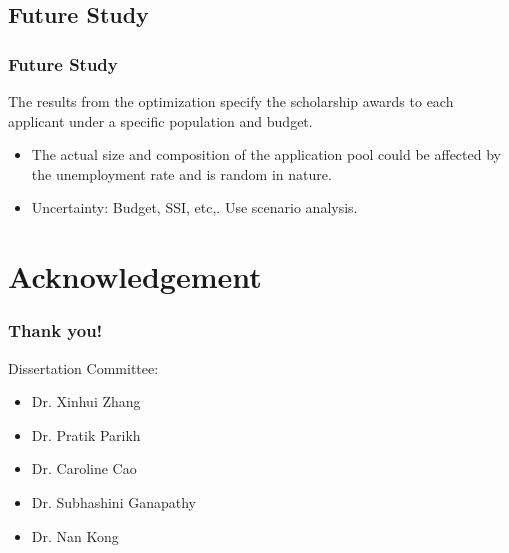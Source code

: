 \documentclass[aspectratio=169]{beamer}
\begin{document}
\subsection{Future Study}
\begin{frame}
\frametitle{Future Study}
The results from the optimization specify the scholarship awards to 
each applicant under a specific population and budget.  
\begin{itemize}
\item  The actual size and composition of the application pool could be
affected by the
       unemployment rate and is random in nature. 

\item Uncertainty: Budget, SSI, etc,. Use scenario analysis.

\end{itemize}

\end{frame}




\section{Acknowledgement}
\begin{frame}
  \frametitle{Thank you!}
    Dissertation Committee:
    \begin{itemize}
    \item Dr. Xinhui Zhang
    \item Dr. Pratik Parikh
    \item Dr. Caroline Cao
    \item Dr. Subhashini Ganapathy
    \item Dr. Nan Kong
    \end{itemize}
\end{frame}
\end{document}
